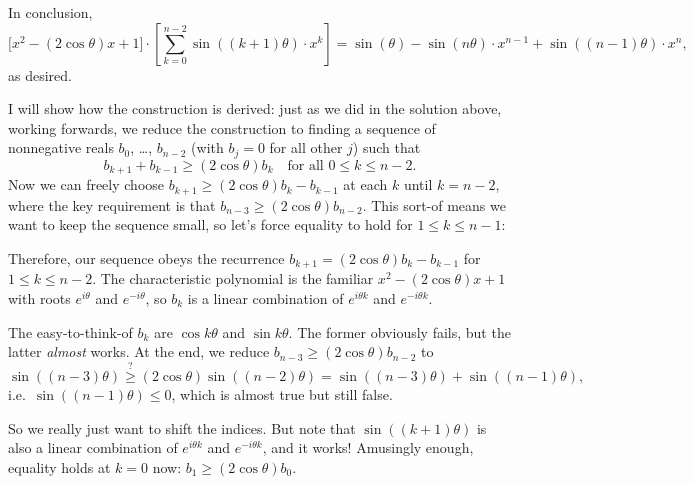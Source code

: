 In conclusion,
\[\Big[x^2-(2\cos\theta)x+1\Big]\cdot\left[\sum_{k=0}^{n-2}\sin( (k+1)\theta)\cdot x^k\right]=\sin(\theta)-\sin(n\theta)\cdot x^{n-1}+\sin( (n-1)\theta)\cdot x^n,\]
as desired.
\begin{remark}
    I will show how the construction is derived: just as we did in the solution above, working forwards, we reduce the construction to finding a sequence of nonnegative reals $b_0$, \ldots, $b_{n-2}$ (with $b_j=0$ for all other $j$) such that
    \[b_{k+1}+b_{k-1}\ge(2\cos\theta)b_k\quad\text{for all }0\le k\le n-2.\]
    Now we can freely choose $b_{k+1}\ge(2\cos\theta)b_k-b_{k-1}$ at each $k$ until $k=n-2$, where the key requirement is that $b_{n-3}\ge(2\cos\theta)b_{n-2}$. This sort-of means we want to keep the sequence small, so let's force equality to hold for $1\le k\le n-1$:

    Therefore, our sequence obeys the recurrence $b_{k+1}=(2\cos\theta)b_k-b_{k-1}$ for $1\le k\le n-2$. The characteristic polynomial is the familiar $x^2-(2\cos\theta)x+1$ with roots $e^{i\theta}$ and $e^{-i\theta}$, so $b_k$ is a linear combination of $e^{i\theta k}$ and $e^{-i\theta k}$.

    The easy-to-think-of $b_k$ are $\cos k\theta$ and $\sin k\theta$. The former obviously fails, but the latter \emph{almost} works. At the end, we reduce $b_{n-3}\ge(2\cos\theta)b_{n-2}$ to
    \[\sin( (n-3)\theta)\stackrel?\ge(2\cos\theta)\sin( (n-2)\theta)=\sin( (n-3)\theta)+\sin( (n-1)\theta),\]
    i.e.\ $\sin( (n-1)\theta)\le0$, which is almost true but still false.

    So we really just want to shift the indices. But note that $\sin( (k+1)\theta)$ is also a linear combination of $e^{i\theta k}$ and $e^{-i\theta k}$, and it works! Amusingly enough, equality holds at $k=0$ now: $b_1\ge(2\cos\theta)b_0$.
\end{remark}

